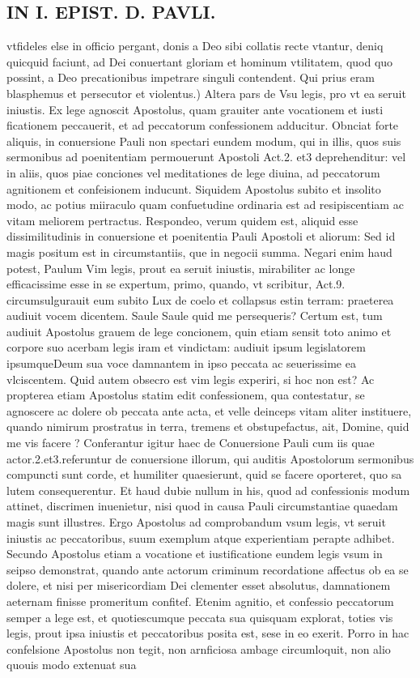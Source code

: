 \documentclass{article}
\begin{document}
\begin{pages}
\section*{IN I. EPIST. D. PAVLI. }
\marginpar{[ p.33 ]}\pstart vtfideles else in officio pergant, donis a Deo sibi collatis recte vtantur, deniq quicquid faciunt, ad Dei conuertant gloriam et hominum vtilitatem, quod quo possint, a Deo precationibus impetrare singuli contendent.  \pend\pstart Qui prius eram blasphemus et persecutor et violentus.) Altera pars de Vsu legis, pro vt ea seruit iniustis. Ex lege agnoscit Apostolus, quam grauiter ante vocationem et iusti ficationem peccauerit, et ad peccatorum confessionem adducitur. Obnciat forte aliquis, in conuersione Pauli non spectari eundem modum, qui in illis, quos suis sermonibus ad poenitentiam permouerunt Apostoli Act.2. et3 deprehenditur: vel in aliis, quos piae conciones vel meditationes de lege diuina, ad peccatorum agnitionem et confeisionem inducunt. Siquidem Apostolus subito et insolito modo, ac potius miiraculo quam confuetudine ordinaria est ad resipiscentiam ac vitam meliorem pertractus. Respondeo, verum quidem est, aliquid esse dissimilitudinis in conuersione et poenitentia Pauli Apostoli et aliorum: Sed id magis positum est in circumstantiis, que  in negocii summa. Negari enim haud potest, Paulum Vim legis, prout ea seruit iniustis, mirabiliter ac longe efficacissime esse in se expertum, primo, quando, vt scribitur, Act.9. circumsulgurauit eum subito Lux de coelo et collapsus estin terram: praeterea audiuit vocem dicentem. Saule Saule quid me persequeris? Certum est, tum audiuit Apostolus grauem de lege concionem, quin etiam sensit toto animo et corpore suo acerbam legis iram et vindictam: audiuit ipsum legislatorem ipsumqueDeum sua voce damnantem in ipso peccata ac seuerissime ea vlciscentem. Quid autem obsecro est vim legis experiri, si hoc non est? Ac propterea etiam Apostolus statim edit confessionem, qua contestatur, se agnoscere ac dolere ob peccata ante acta, et velle deinceps vitam aliter instituere, quando nimirum prostratus in terra, tremens et obstupefactus, ait,   Domine, quid me vis facere ? Conferantur igitur haec de Conuersione Pauli cum iis quae actor.2.et3.referuntur de conuersione illorum, qui auditis Apostolorum sermonibus compuncti sunt corde, et humiliter quaesierunt, quid se facere oporteret, quo sa lutem consequerentur. Et haud dubie nullum in his, quod ad confessionis modum attinet, discrimen inuenietur, nisi quod in causa Pauli circumstantiae quaedam magis sunt illustres. Ergo Apostolus ad comprobandum vsum legis, vt seruit iniustis ac peccatoribus, suum exemplum atque  experientiam perapte adhibet. Secundo Apostolus etiam a vocatione et iustificatione eundem legis vsum in seipso demonstrat, quando ante actorum criminum recordatione affectus ob ea se dolere, et nisi per misericordiam Dei clementer esset absolutus, damnationem aeternam finisse promeritum confitef. Etenim agnitio, et confessio peccatorum semper a lege est, et quotiescumque  peccata sua quisquam explorat, toties vis legis, prout ipsa iniustis et peccatoribus posita est, sese in eo exerit. Porro in hac confelsione Apostolus non tegit, non arnficiosa ambage circumloquit, non alio quouis modo extenuat sua 
\end{pages}
\end{document}
